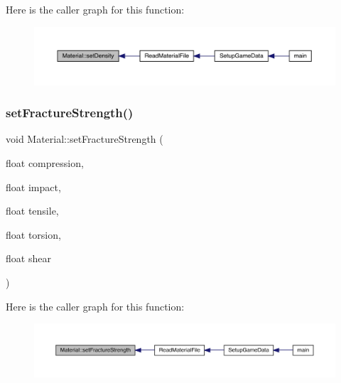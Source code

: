 Here is the caller graph for this function\+:
\nopagebreak
\begin{figure}[H]
\begin{center}
\leavevmode
\includegraphics[width=350pt]{class_material_ab7aca2e9daaf35b5b8a45ee677c07073_icgraph}
\end{center}
\end{figure}
\mbox{\label{class_material_a9c2547bdd4f225f9ad2351b8c2ad7c7e}} 
\subsubsection{\texorpdfstring{set\+Fracture\+Strength()}{setFractureStrength()}}
{\footnotesize\ttfamily void Material\+::set\+Fracture\+Strength (\begin{DoxyParamCaption}\item[{float}]{compression,  }\item[{float}]{impact,  }\item[{float}]{tensile,  }\item[{float}]{torsion,  }\item[{float}]{shear }\end{DoxyParamCaption})}

Here is the caller graph for this function\+:
\nopagebreak
\begin{figure}[H]
\begin{center}
\leavevmode
\includegraphics[width=350pt]{class_material_a9c2547bdd4f225f9ad2351b8c2ad7c7e_icgraph}
\end{center}
\end{figure}
\mbox{\label{class_material_ab73b88e094cf38d28f9addfd12357b04}} 

